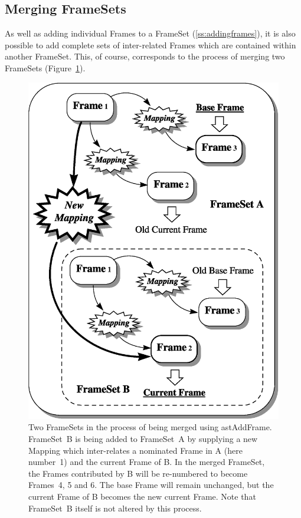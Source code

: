 \documentclass[twoside,11pt]{article}
\newenvironment{latexonly}{}{}
\newcommand{\htmlref}[2]{#1}
\newcommand{\secref}[1]{\S\ref{#1}}
\renewcommand{\secref}[1]{\ref{#1}}
\begin{document}
\subsection{Merging FrameSets}

\begin{latexonly}
   As well as adding individual Frames to a \htmlref{FrameSet}{FrameSet}
   (\secref{ss:addingframes}), it is also possible to add complete sets of
   inter-related Frames which are contained within another
   FrameSet. This, of course, corresponds to the process of merging two
   FrameSets (Figure~\ref{fig:fsmerge}).
   \begin{figure}[hbtp]
   \begin{center}
   \includegraphics[scale=0.6]{sun211_figures/fsmerge.eps}
   \caption{Two FrameSets in the process of being merged using
   \htmlref{astAddFrame}{astAddFrame}. FrameSet~B is being added to FrameSet~A by supplying a
   new \htmlref{Mapping}{Mapping} which inter-relates a nominated \htmlref{Frame}{Frame} in A (here number~1)
   and the current Frame of B. In the merged FrameSet, the Frames
   contributed by B will be re-numbered to become Frames~4, 5 and 6. The
   base Frame will remain unchanged, but the current Frame of B becomes
   the new current Frame. Note that FrameSet~B itself is not
   altered by this process.}
   \label{fig:fsmerge}
   \end{center}
   \end{figure}
\end{latexonly}
\end{document}
